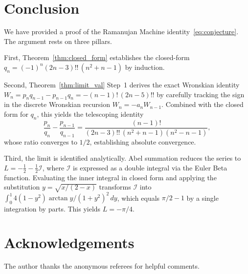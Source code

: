 \documentclass[11pt,reqno]{amsart}
\theoremstyle{definition}
\begin{document}
\section{Conclusion}

We have provided a proof of the Ramanujan Machine
identity~\eqref{eq:conjecture}. The argument rests on three pillars.

First, Theorem~\ref{thm:closed_form} establishes the closed-form
$q_n = (-1)^n(2n-3)!!\,(n^2+n-1)$ by induction.

Second, Theorem~\ref{thm:limit_val} Step~1 derives the exact Wronskian
identity $W_n = p_n q_{n-1} - p_{n-1}q_n = -(n-1)!\,(2n-5)!!$ by
carefully tracking the sign in the discrete Wronskian recursion
$W_n = -a_n W_{n-1}$. Combined with the closed form for $q_n$, this
yields the telescoping identity
\[
  \frac{p_n}{q_n} - \frac{p_{n-1}}{q_{n-1}}
  = \frac{(n-1)!}{(2n-3)!!\,(n^2+n-1)(n^2-n-1)},
\]
whose ratio converges to $1/2$, establishing absolute convergence.

Third, the limit is identified analytically. Abel summation reduces the series to $L=-\frac12-\frac12\mathcal{I}$, where $\mathcal{I}$ is expressed as a double integral via the Euler Beta function. Evaluating the inner integral in closed form and applying the substitution $y=\sqrt{x/(2-x)}$ transforms $\mathcal{I}$ into $\int_0^1 4(1-y^2)\arctan y/(1+y^2)^2\,dy$, which equals $\pi/2-1$ by a single integration by parts. This yields $L=-\pi/4$.

\section*{Acknowledgements}
The author thanks the anonymous referees for helpful comments.



\end{document}
